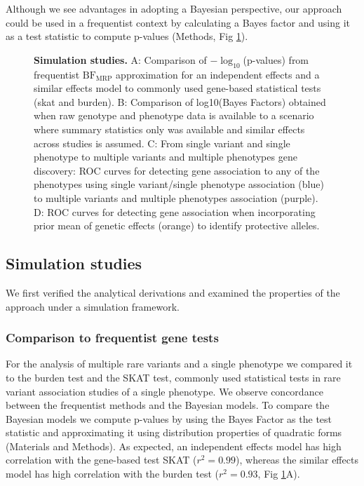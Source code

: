 Although we see advantages in adopting a Bayesian perspective, our approach could be used in a frequentist context by calculating a Bayes factor and using it as a test statistic to compute p-values (Methods, Fig \ref{fig2}).
 
\begin{figure}[!h]
\caption{{\bf Simulation studies.}
A: Comparison of $-\log_{10}$(p-values) from frequentist $\textrm{BF}_{\textrm{MRP}}$ approximation for an independent effects and a similar effects model to commonly used gene-based statistical tests (skat and burden). B: Comparison of log10(Bayes Factors) obtained when raw genotype and phenotype data is available to a scenario where summary statistics only was available and similar effects across studies is assumed. C: From single variant and single phenotype to multiple variants and multiple phenotypes gene discovery: ROC curves for detecting gene association to any of the phenotypes using single variant/single phenotype association (blue) to multiple variants and multiple phenotypes association (purple). D: ROC curves for detecting gene association when incorporating prior mean of genetic effects (orange) to identify protective alleles.}
\label{fig2}
\end{figure}

\subsection*{Simulation studies}
We first verified the analytical derivations and examined the properties of the approach under a simulation framework. 

\subsubsection*{Comparison to frequentist gene tests}
For the analysis of multiple rare variants and a single phenotype we compared it to the burden test and the SKAT test, commonly used statistical tests in rare variant association studies of a single phenotype. We observe concordance between the frequentist methods and the Bayesian models. To compare the Bayesian models we compute p-values by using the Bayes Factor as the test statistic and approximating it using distribution properties of quadratic forms (Materials and Methods). As expected, an independent effects model has high correlation with the gene-based test SKAT ($r^2 = 0.99$), whereas the similar effects model has high correlation with the burden test ($r^2 = 0.93$, Fig \ref{fig2}A). 

